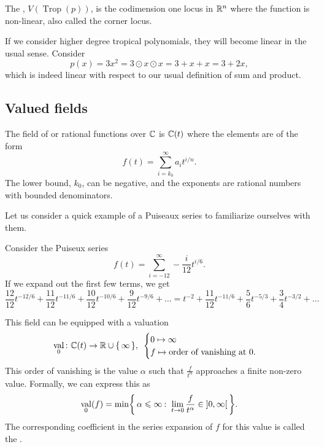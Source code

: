 \documentclass[12pt]{memoir}
\DeclareMathOperator{\val}{val}
\DeclareMathOperator{\Trop}{Trop}
\theoremstyle{definition}
\def\al{\alpha}
\begin{document}
\begin{Def}
    The , $V(\Trop(p))$, is the codimension one locus in $\mathbb{R}^n$ where the function is non-linear, also called the corner locus.
\end{Def}

\begin{Ex}
If we consider higher degree tropical polynomials, they will become linear in the usual sense. Consider 
$$p(x)=3x^2=3\odot x\odot x=3+x+x=3+2x,$$
which is indeed linear with respect to our usual definition of sum and product.
\end{Ex}

\subsection{Valued fields}

\begin{Def}
The field of  or rational functions over $\mathbb{C}$ is $\mathbb{C}(t)$ where the elements are of the form 
$$f(t)=\sum_{i=k_0}^\infty a_it^{i/n}.$$
The lower bound, $k_0$, can be negative, and the exponents are rational numbers with bounded denominators. 
\end{Def}

Let us consider a quick example of a Puiseaux series to familiarize ourselves with them. 

\begin{Ex}
    Consider the Puiseux series 
    $$f(t)=\sum_{i=-12}^\infty -\frac{i}{12}t^{i/6}.$$
    If we expand out the first few terms, we get 
    $$\frac{12}{12}t^{-12/6}+\frac{11}{12}t^{-11/6}+\frac{10}{12}t^{-10/6}+\frac{9}{12}t^{-9/6}+\ldots=t^{-2}+\frac{11}{12}t^{-11/6}+\frac{5}{6}t^{-5/3}+\frac{3}{4}t^{-3/2}+\ldots$$
\end{Ex}
This field can be equipped with a valuation
$$\val_0\:\text{ }\bC(t)\to\bR\cup\set{\infty},\text{   }\begin{cases}
    0\mapsto \infty\\
    f\mapsto\text{order of vanishing at }0.
\end{cases}$$
This order of vanishing is the value $\al$ such that $\frac{f}{t^\al}$ approaches a finite non-zero value. Formally, we can express this as 
$$\val_0(f)=\min\Set{\al\leq\infty\:\ \lim_{t\to0}\frac{f}{t^\al}\in\obonj{0,\infty}}.$$
The corresponding coefficient in the series expansion of $f$ for this value is called the .
\end{document}
